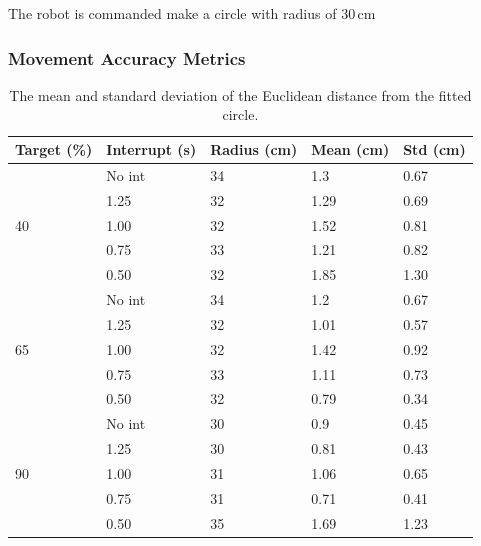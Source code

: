 The robot is commanded make a circle with radius of 30\,cm
\subsubsection{Movement Accuracy Metrics}



\begin{table}[t]
	\centering
	\caption{The mean and standard deviation of the Euclidean distance from the fitted circle.}
	\label{tab:circular_results}
	\begin{tabular}{|l|l||l|l|l|}
		\hline
		Target (\%) & Interrupt (s) & Radius (cm) & Mean (cm) & Std (cm)\\
		\hline \hline
		\multirow{5}{*}{40} & No int & 34 & 1.3 & 0.67 \\
		& 1.25 & 32 & 1.29 & 0.69 \\
		& 1.00 & 32 & 1.52 & 0.81 \\
		& 0.75 & 33 & 1.21 & 0.82 \\
		& 0.50 & 32 & 1.85 & 1.30 \\
		\hline
		\multirow{5}{*}{65} & No int & 34 & 1.2 & 0.67 \\
		& 1.25 & 32 & 1.01 & 0.57 \\
		& 1.00 & 32 & 1.42 & 0.92 \\
		& 0.75 & 33 & 1.11 & 0.73 \\
		& 0.50 & 32 & 0.79 & 0.34 \\
		\hline
		\multirow{5}{*}{90} & No int & 30 & 0.9 & 0.45 \\
		& 1.25 & 30 & 0.81 & 0.43 \\
		& 1.00 & 31 & 1.06 & 0.65 \\
		& 0.75 & 31 & 0.71 & 0.41 \\
		& 0.50 & 35 & 1.69 & 1.23 \\
		\hline
	\end{tabular}
\end{table}


